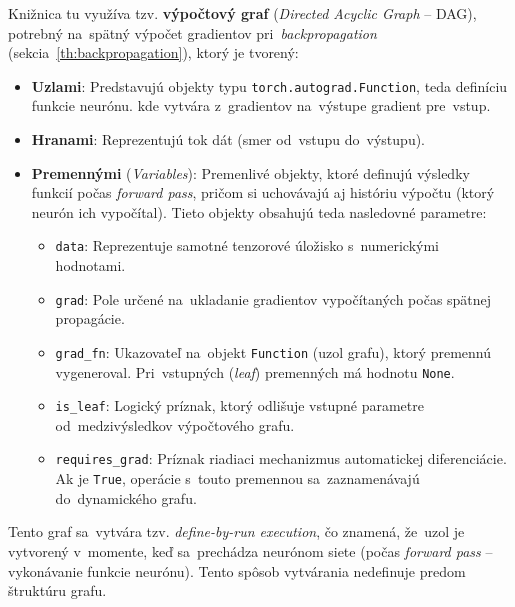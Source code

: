 Knižnica tu využíva tzv. \textbf{výpočtový graf} (\textit{Directed Acyclic Graph} -- DAG), potrebný na~spätný výpočet gradientov pri~\textit{backpropagation} (sekcia~\ref{th:backpropagation}), ktorý je tvorený:
\begin{itemize}
    \item \textbf{Uzlami}: Predstavujú objekty typu \texttt{torch.autograd.Function}, teda definíciu funkcie neurónu.  kde vytvára z~gradientov na~výstupe gradient pre~vstup.
    \item \textbf{Hranami}: Reprezentujú tok dát (smer od~vstupu do~výstupu).
    \item \textbf{Premennými} (\textit{Variables}): Premenlivé objekty, ktoré definujú výsledky funkcií počas \textit{forward pass}, pričom si uchovávajú aj históriu výpočtu (ktorý neurón ich vypočítal). Tieto objekty obsahujú teda nasledovné parametre:~\cite{pytorch.autograd, pytorch.leaf_vs_nonleaf}

    \begin{itemize}
    \item \texttt{data}: Reprezentuje samotné tenzorové úložisko s~numerickými hodnotami.
    \item \texttt{grad}: Pole určené na~ukladanie gradientov vypočítaných počas spätnej propagácie.
    \item \texttt{grad\_fn}: Ukazovateľ na~objekt \texttt{Function} (uzol grafu), ktorý premennú vygeneroval. Pri~vstupných (\textit{leaf}) premenných má hodnotu \texttt{None}.
    \item \texttt{is\_leaf}: Logický príznak, ktorý odlišuje vstupné parametre od~medzivýsledkov výpočtového grafu.
    \item \texttt{requires\_grad}: Príznak riadiaci mechanizmus automatickej diferenciácie. Ak je \texttt{True}, operácie s~touto premennou sa~zaznamenávajú do~dynamického grafu.
    \end{itemize}
    
\end{itemize}
Tento graf sa~vytvára tzv. \textit{define-by-run execution}, čo znamená, že~uzol je vytvorený v~momente, keď sa~prechádza neurónom siete (počas \textit{forward pass} -- vykonávanie funkcie neurónu). Tento spôsob vytvárania nedefinuje predom štruktúru grafu. 

